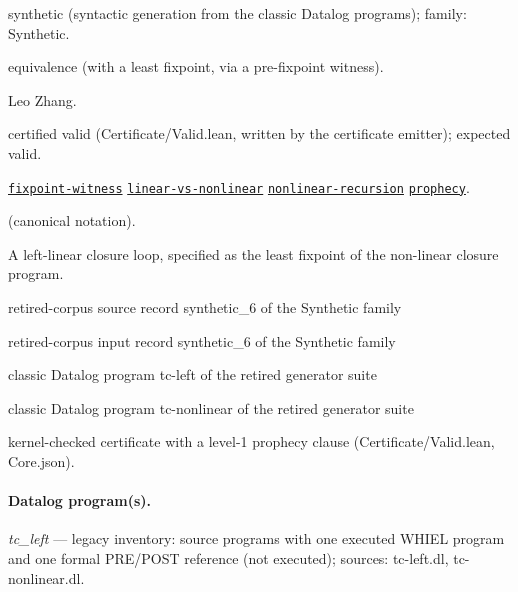 \documentclass[10pt]{article}
\begin{document}
\begin{description}[leftmargin=2.6cm,style=nextline,itemsep=1pt]

\item[Category] synthetic (syntactic generation from the classic Datalog programs); family: Synthetic.

\item[Kind] equivalence (with a least fixpoint, via a pre-fixpoint witness).

\item[Contributors] Leo Zhang.

\item[Status] certified valid (Certificate/Valid.lean, written by the certificate emitter); expected valid.

\item[Tags] \hyperref[tag:fixpoint-witness]{\texttt{fixpoint-witness}} \hyperref[tag:linear-vs-nonlinear]{\texttt{linear-vs-nonlinear}} \hyperref[tag:nonlinear-recursion]{\texttt{nonlinear-recursion}} \hyperref[tag:prophecy]{\texttt{prophecy}}.

\item[Input]  (canonical notation).

\item[Summary] A left-linear closure loop, specified as the least fixpoint of the non-linear closure program.

\item[Sources] {\raggedright retired-corpus source record synthetic\_6 of the Synthetic family \par retired-corpus input record synthetic\_6 of the Synthetic family \par classic Datalog program tc-left of the retired generator suite \par classic Datalog program tc-nonlinear of the retired generator suite\par}

\item[Prophecy] kernel-checked certificate with a level-1 prophecy clause (Certificate/Valid.lean, Core.json).

\end{description}

\paragraph{Datalog program(s).}

{\raggedright\textit{tc\_left} --- legacy inventory: source programs with one executed WHIEL program and one formal PRE/POST reference (not executed); sources: tc-left.dl, tc-nonlinear.dl.\par}
\end{document}
